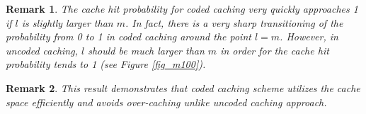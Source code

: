 \documentclass[10pt,journal]{IEEEtran}
\newtheorem{rem}{Remark}
\begin{document}
{\begin{rem}{\em 
The cache hit probability for coded caching very quickly approaches 1 if $l$ is slightly larger than $m$. In fact, there is a very sharp transitioning of the probability from 0 to 1 in coded caching around the point $l = m$. However, in uncoded caching, $l$ should be much larger than $m$ in order for the cache hit probability tends to 1 (see Figure \ref{fig_m100}). 
}\label{rem_compare_cache_hit}
\end{rem}

\begin{rem}{\em
This result demonstrates that coded caching scheme utilizes the cache space efficiently and avoids over-caching unlike uncoded caching approach. 
}\label{rem_overcaching} 
\end{rem}



}
\end{document}
